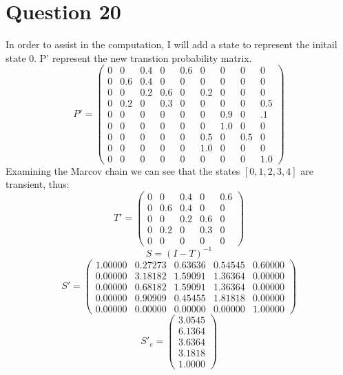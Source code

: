 \documentclass{article}
\begin{document}
  \section*{Question 20}
  In order to assist in the computation, I will add a state to represent the
  initail state 0. P' represent the new transtion probability matrix.
   \[ P' =\left(
  \begin{array}{rrrrrrrrr}
  0 & 0  & 0.4 & 0  & 0.6 & 0   & 0   & 0  & 0  \\
  0 & 0.6 & 0.4 & 0  & 0 & 0   & 0   & 0  & 0  \\
  0 & 0  & 0.2 & 0.6 & 0 & 0.2  & 0   & 0  & 0  \\
  0 & 0.2 & 0   & 0.3 & 0 & 0   & 0   & 0  & 0.5 \\
  0 & 0  & 0   & 0  & 0 & 0   & 0.9  & 0  & .1 \\
  0 & 0  & 0   & 0  & 0 & 0   & 1.0 &  0 & 0  \\
  0 & 0  & 0   & 0  & 0 & 0.5  & 0   & 0.5 & 0  \\
  0 & 0  & 0   & 0  & 0 & 1.0 & 0   & 0  & 0  \\
  0 & 0  & 0   & 0  & 0 & 0   & 0   & 0  & 1.0
  \end{array}\right)\]
  Examining the Marcov chain we can see that the states $[0,1,2,3,4]$ are
  transient, thus:
   \[ T' =\left(\begin{array}{rrrrr}
  0 & 0   & 0.4 & 0   & 0.6  \\
  0 & 0.6 & 0.4 & 0   & 0    \\
  0 & 0   & 0.2 & 0.6 & 0    \\
  0 & 0.2 & 0   & 0.3 & 0    \\
  0 & 0   & 0   & 0   & 0   
  \end{array}\right)\]
  \[S = (I - T)^{-1}\]
  \[ S'= \left(\begin{array}{rrrrr}
   1.00000 & 0.27273 & 0.63636 & 0.54545 & 0.60000 \\
   0.00000 & 3.18182 & 1.59091 & 1.36364 & 0.00000 \\
   0.00000 & 0.68182 & 1.59091 & 1.36364 & 0.00000 \\
   0.00000 & 0.90909 & 0.45455 & 1.81818 & 0.00000 \\
   0.00000 & 0.00000 & 0.00000 & 0.00000 & 1.00000
  \end{array}\right)\]
  \[S'_e = \left(\begin{array}{r}
   3.0545\\
   6.1364\\
   3.6364\\
   3.1818\\
   1.0000 \end{array}\right)\]
\end{document}
